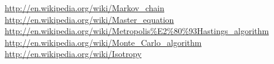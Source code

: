 \documentclass[11pt,english,a4paper]{article}
\begin{document}
\begin{flushleft}
\begin{thebibliography}{1}
\href{http://en.wikipedia.org/wiki/Markov\_chain}{http://en.wikipedia.org/wiki/Markov\_chain}
\href{http://en.wikipedia.org/wiki/Master\_equation}{http://en.wikipedia.org/wiki/Master\_equation}
\href{http://en.wikipedia.org/wiki/Metropolis\%E2\%80\%93Hastings\_algorithm}{http://en.wikipedia.org/wiki/Metropolis\%E2\%80\%93Hastings\_algorithm}
\href{http://en.wikipedia.org/wiki/Monte\_Carlo\_algorithm}{http://en.wikipedia.org/wiki/Monte\_Carlo\_algorithm}
\href{http://en.wikipedia.org/wiki/Isotropy}{http://en.wikipedia.org/wiki/Isotropy}
\end{thebibliography}

\end{flushleft}
\end{document}
